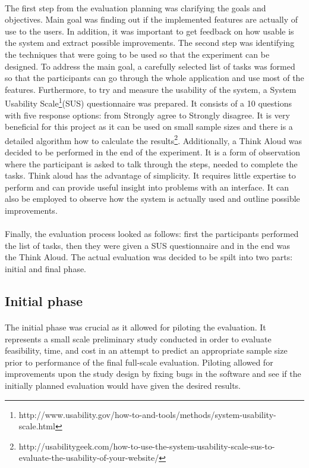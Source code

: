 \documentclass{l4proj}
\begin{document}
\paragraph{}
The first step from the evaluation planning was clarifying the goals and objectives. Main goal was finding out if the implemented features are actually of use to the users. In addition, it was important to get feedback on how usable is the system and extract possible improvements. The second step was identifying the techniques that were going to be used so that the experiment can be designed. To address the main goal,  a carefully selected list of tasks was formed so that the participants can go through the whole application and use most of the features. Furthermore, to try and measure the usability of the system, a System Usability Scale\footnote{http://www.usability.gov/how-to-and-tools/methods/system-usability-scale.html}(SUS) questionnaire was prepared. It consists of a 10 questions with five response options: from Strongly agree to Strongly disagree. It is very beneficial for this project as it can be used on small sample sizes and there is a detailed algorithm how to calculate the results\footnote{http://usabilitygeek.com/how-to-use-the-system-usability-scale-sus-to-evaluate-the-usability-of-your-website/}. Additionally, a Think Aloud was decided to be performed in the end of the experiment. It is a form of observation where the participant is asked to talk through the steps, needed to complete the tasks\cite{hci}. Think aloud has the advantage of simplicity. It requires little expertise to perform and can provide useful insight into problems with an interface. It can also be employed to observe how the system is actually used and outline possible improvements.
\paragraph{} 
 Finally, the evaluation process looked as follows: first the participants performed the list of tasks, then they were given a SUS questionnaire and in the end was the Think Aloud. The actual evaluation was decided to be spilt into two parts: initial and final phase.
\subsection{Initial phase}
\paragraph{}
The initial phase was crucial as it allowed for piloting the evaluation. It represents a small scale preliminary study conducted in order to evaluate feasibility, time, and cost in an attempt to predict an appropriate sample size prior to performance of the final full-scale evaluation\cite{clinicalresearch}. Piloting allowed for improvements upon the study design by fixing bugs in the software and see if the initially planned evaluation would have given the desired results.
\end{document}
